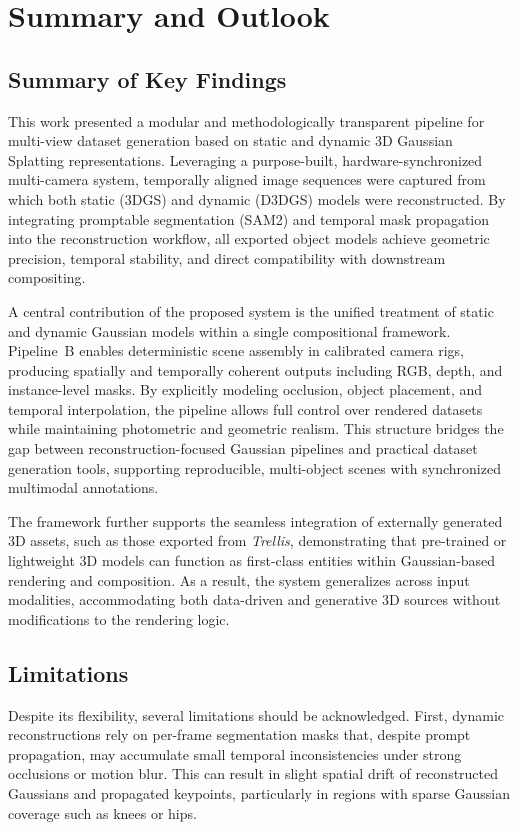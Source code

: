 \chapter{Summary and Outlook}

\section{Summary of Key Findings}

This work presented a modular and methodologically transparent pipeline for multi-view dataset generation based on static and dynamic 3D Gaussian Splatting representations.
Leveraging a purpose-built, hardware-synchronized multi-camera system, temporally aligned image sequences were captured from which both static (3DGS) and dynamic (D3DGS) models were reconstructed.
By integrating promptable segmentation (SAM2) and temporal mask propagation into the reconstruction workflow, all exported object models achieve geometric precision, temporal stability, and direct compatibility with downstream compositing.

A central contribution of the proposed system is the unified treatment of static and dynamic Gaussian models within a single compositional framework.
Pipeline~B enables deterministic scene assembly in calibrated camera rigs, producing spatially and temporally coherent outputs including RGB, depth, and instance-level masks.
By explicitly modeling occlusion, object placement, and temporal interpolation, the pipeline allows full control over rendered datasets while maintaining photometric and geometric realism.
This structure bridges the gap between reconstruction-focused Gaussian pipelines and practical dataset generation tools, supporting reproducible, multi-object scenes with synchronized multimodal annotations.

The framework further supports the seamless integration of externally generated 3D assets, such as those exported from \emph{Trellis}, demonstrating that pre-trained or lightweight 3D models can function as first-class entities within Gaussian-based rendering and composition.
As a result, the system generalizes across input modalities, accommodating both data-driven and generative 3D sources without modifications to the rendering logic.

\section{Limitations}

Despite its flexibility, several limitations should be acknowledged.
First, dynamic reconstructions rely on per-frame segmentation masks that, despite prompt propagation, may accumulate small temporal inconsistencies under strong occlusions or motion blur.
This can result in slight spatial drift of reconstructed Gaussians and propagated keypoints, particularly in regions with sparse Gaussian coverage such as knees or hips.

